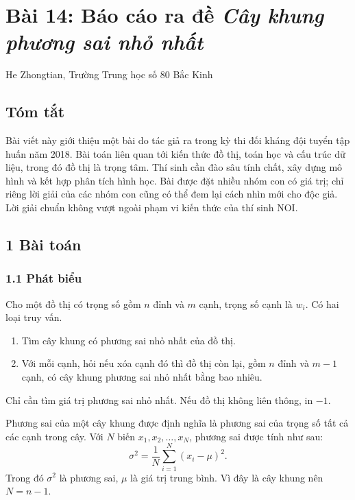 \documentclass[11pt]{article}
\begin{document}
\section{Bài 14: Báo cáo ra đề \emph{Cây khung phương sai nhỏ nhất}}

\begin{center}
He Zhongtian, Trường Trung học số 80 Bắc Kinh
\end{center}

\subsection*{Tóm tắt}

Bài viết này giới thiệu một bài do tác giả ra trong kỳ thi đối kháng đội tuyển
tập huấn năm 2018. Bài toán liên quan tới kiến thức đồ thị, toán học và cấu
trúc dữ liệu, trong đó đồ thị là trọng tâm. Thí sinh cần đào sâu tính chất, xây
dựng mô hình và kết hợp phân tích hình học. Bài được đặt nhiều nhóm con có giá
trị; chỉ riêng lời giải của các nhóm con cũng có thể đem lại cách nhìn mới cho
độc giả. Lời giải chuẩn không vượt ngoài phạm vi kiến thức của thí sinh NOI.

\subsection*{1 Bài toán}

\subsubsection*{1.1 Phát biểu}

Cho một đồ thị có trọng số gồm \(n\) đỉnh và \(m\) cạnh, trọng số cạnh là
\(w_i\). Có hai loại truy vấn.

\begin{enumerate}
  \item Tìm cây khung có phương sai nhỏ nhất của đồ thị.
  \item Với mỗi cạnh, hỏi nếu xóa cạnh đó thì đồ thị còn lại, gồm \(n\) đỉnh và
  \(m-1\) cạnh, có cây khung phương sai nhỏ nhất bằng bao nhiêu.
\end{enumerate}

Chỉ cần tìm giá trị phương sai nhỏ nhất. Nếu đồ thị không liên thông, in
\(-1\).

Phương sai của một cây khung được định nghĩa là phương sai của trọng số tất cả
các cạnh trong cây. Với \(N\) biến \(x_1,x_2,\ldots,x_N\), phương sai được tính
như sau:
\[
  \sigma^2=\frac1N\sum_{i=1}^{N}(x_i-\mu)^2.
\]
Trong đó \(\sigma^2\) là phương sai, \(\mu\) là giá trị trung bình. Vì đây là
cây khung nên \(N=n-1\).
\end{document}
